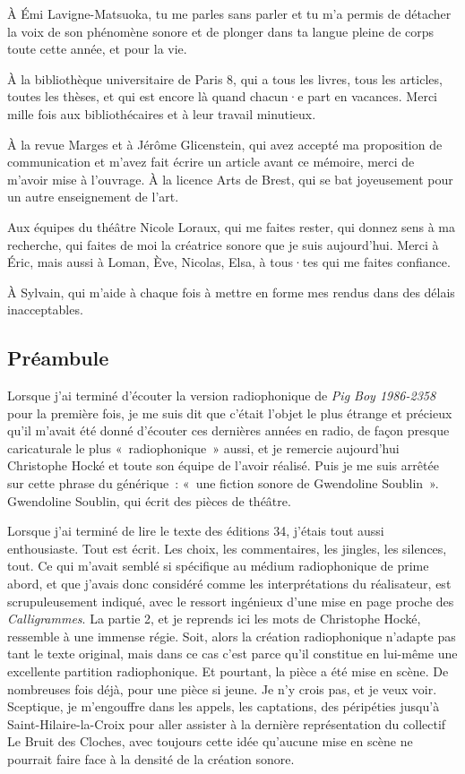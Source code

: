 \documentclass[
]{article}
\begin{document}
À Émi Lavigne-Matsuoka, tu me parles sans parler et tu m'a permis de détacher la voix de son phénomène sonore et de plonger dans ta langue pleine de corps toute cette année, et pour la vie.

À la bibliothèque universitaire de Paris 8, qui a tous les livres, tous les articles, toutes les thèses, et qui est encore là quand chacun·e part en vacances. Merci mille fois aux bibliothécaires et à leur travail minutieux.

À la revue Marges et à Jérôme Glicenstein, qui avez accepté ma proposition de communication et m'avez fait écrire un article avant ce mémoire, merci de m'avoir mise à l'ouvrage. À la licence Arts de Brest, qui se bat joyeusement pour un autre enseignement de l'art.

Aux équipes du théâtre Nicole Loraux, qui me faites rester, qui donnez sens à ma recherche, qui faites de moi la créatrice sonore que je suis aujourd'hui. Merci à Éric, mais aussi à Loman, Ève, Nicolas, Elsa, à tous·tes qui me faites confiance.

À Sylvain, qui m'aide à chaque fois à mettre en forme mes rendus dans des délais inacceptables.

\subsection{Préambule}\label{pruxe9ambule}

Lorsque j'ai terminé d'écouter la version radiophonique de \emph{Pig Boy 1986-2358} pour la première fois, je me suis dit que c'était l'objet le plus étrange et précieux qu'il m'avait été donné d'écouter ces dernières années en radio, de façon presque caricaturale le plus «~radiophonique~» aussi, et je remercie aujourd'hui Christophe Hocké et toute son équipe de l'avoir réalisé. Puis je me suis arrêtée sur cette phrase du générique~: «~une fiction sonore de Gwendoline Soublin~». Gwendoline Soublin, qui écrit des pièces de théâtre.

Lorsque j'ai terminé de lire le texte des éditions 34, j'étais tout aussi enthousiaste. Tout est écrit. Les choix, les commentaires, les jingles, les silences, tout. Ce qui m'avait semblé si spécifique au médium radiophonique de prime abord, et que j'avais donc considéré comme les interprétations du réalisateur, est scrupuleusement indiqué, avec le ressort ingénieux d'une mise en page proche des \emph{Calligrammes}. La partie 2, et je reprends ici les mots de Christophe Hocké, ressemble à une immense régie. Soit, alors la création radiophonique n'adapte pas tant le texte original, mais dans ce cas c'est parce qu'il constitue en lui-même une excellente partition radiophonique. Et pourtant, la pièce a été mise en scène. De nombreuses fois déjà, pour une pièce si jeune. Je n'y crois pas, et je veux voir. Sceptique, je m'engouffre dans les appels, les captations, des péripéties jusqu'à Saint-Hilaire-la-Croix pour aller assister à la dernière représentation du collectif Le Bruit des Cloches, avec toujours cette idée qu'aucune mise en scène ne pourrait faire face à la densité de la création sonore.
\end{document}
